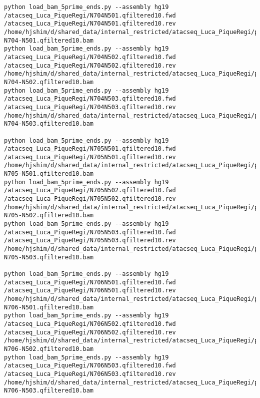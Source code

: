 \documentclass[11pt]{article}
\begin{document}
\begin{lstlisting}
python load_bam_5prime_ends.py --assembly hg19 /atacseq_Luca_PiqueRegi/N704N501.qfiltered10.fwd /atacseq_Luca_PiqueRegi/N704N501.qfiltered10.rev /home/hjshim/d/shared_data/internal_restricted/atacseq_Luca_PiqueRegi/processedbamfiles/AT2-N704-N501.qfiltered10.bam
python load_bam_5prime_ends.py --assembly hg19 /atacseq_Luca_PiqueRegi/N704N502.qfiltered10.fwd /atacseq_Luca_PiqueRegi/N704N502.qfiltered10.rev /home/hjshim/d/shared_data/internal_restricted/atacseq_Luca_PiqueRegi/processedbamfiles/AT2-N704-N502.qfiltered10.bam
python load_bam_5prime_ends.py --assembly hg19 /atacseq_Luca_PiqueRegi/N704N503.qfiltered10.fwd /atacseq_Luca_PiqueRegi/N704N503.qfiltered10.rev /home/hjshim/d/shared_data/internal_restricted/atacseq_Luca_PiqueRegi/processedbamfiles/AT2-N704-N503.qfiltered10.bam

python load_bam_5prime_ends.py --assembly hg19 /atacseq_Luca_PiqueRegi/N705N501.qfiltered10.fwd /atacseq_Luca_PiqueRegi/N705N501.qfiltered10.rev /home/hjshim/d/shared_data/internal_restricted/atacseq_Luca_PiqueRegi/processedbamfiles/AT2-N705-N501.qfiltered10.bam
python load_bam_5prime_ends.py --assembly hg19 /atacseq_Luca_PiqueRegi/N705N502.qfiltered10.fwd /atacseq_Luca_PiqueRegi/N705N502.qfiltered10.rev /home/hjshim/d/shared_data/internal_restricted/atacseq_Luca_PiqueRegi/processedbamfiles/AT2-N705-N502.qfiltered10.bam
python load_bam_5prime_ends.py --assembly hg19 /atacseq_Luca_PiqueRegi/N705N503.qfiltered10.fwd /atacseq_Luca_PiqueRegi/N705N503.qfiltered10.rev /home/hjshim/d/shared_data/internal_restricted/atacseq_Luca_PiqueRegi/processedbamfiles/AT2-N705-N503.qfiltered10.bam

python load_bam_5prime_ends.py --assembly hg19 /atacseq_Luca_PiqueRegi/N706N501.qfiltered10.fwd /atacseq_Luca_PiqueRegi/N706N501.qfiltered10.rev /home/hjshim/d/shared_data/internal_restricted/atacseq_Luca_PiqueRegi/processedbamfiles/AT2-N706-N501.qfiltered10.bam
python load_bam_5prime_ends.py --assembly hg19 /atacseq_Luca_PiqueRegi/N706N502.qfiltered10.fwd /atacseq_Luca_PiqueRegi/N706N502.qfiltered10.rev /home/hjshim/d/shared_data/internal_restricted/atacseq_Luca_PiqueRegi/processedbamfiles/AT2-N706-N502.qfiltered10.bam
python load_bam_5prime_ends.py --assembly hg19 /atacseq_Luca_PiqueRegi/N706N503.qfiltered10.fwd /atacseq_Luca_PiqueRegi/N706N503.qfiltered10.rev /home/hjshim/d/shared_data/internal_restricted/atacseq_Luca_PiqueRegi/processedbamfiles/AT2-N706-N503.qfiltered10.bam
\end{lstlisting}
\end{document}
